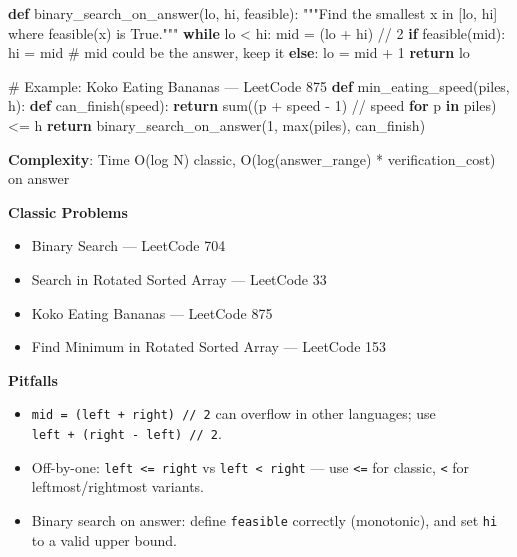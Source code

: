 \documentclass[11pt]{article}
\providecommand{\tightlist}{\setlength{\itemsep}{1pt}\setlength{\parskip}{0pt}}
\newenvironment{Shaded}{\begin{snugshade}}{\end{snugshade}}
\newcommand{\BuiltInTok}[1]{\textcolor[rgb]{0.50,0.55,0.55}{#1}}
\newcommand{\CommentTok}[1]{\textcolor[rgb]{0.48,0.49,0.49}{#1}}
\newcommand{\ControlFlowTok}[1]{\textcolor[rgb]{0.99,0.74,0.29}{\textbf{#1}}}
\newcommand{\DecValTok}[1]{\textcolor[rgb]{0.96,0.45,0.00}{#1}}
\newcommand{\KeywordTok}[1]{\textcolor[rgb]{0.81,0.81,0.76}{\textbf{#1}}}
\newcommand{\NormalTok}[1]{\textcolor[rgb]{0.81,0.81,0.76}{#1}}
\newcommand{\OperatorTok}[1]{\textcolor[rgb]{0.81,0.81,0.76}{#1}}
\begin{document}
\begin{Shaded}
\begin{Highlighting}[]
\KeywordTok{def}\NormalTok{ binary\_search\_on\_answer(lo, hi, feasible):}
    \CommentTok{"""Find the smallest x in [lo, hi] where feasible(x) is True."""}
    \ControlFlowTok{while}\NormalTok{ lo }\OperatorTok{\textless{}}\NormalTok{ hi:}
\NormalTok{        mid }\OperatorTok{=}\NormalTok{ (lo }\OperatorTok{+}\NormalTok{ hi) }\OperatorTok{//} \DecValTok{2}
        \ControlFlowTok{if}\NormalTok{ feasible(mid):}
\NormalTok{            hi }\OperatorTok{=}\NormalTok{ mid          }\CommentTok{\# mid could be the answer, keep it}
        \ControlFlowTok{else}\NormalTok{:}
\NormalTok{            lo }\OperatorTok{=}\NormalTok{ mid }\OperatorTok{+} \DecValTok{1}
    \ControlFlowTok{return}\NormalTok{ lo}

\CommentTok{\# Example: Koko Eating Bananas — LeetCode 875}
\KeywordTok{def}\NormalTok{ min\_eating\_speed(piles, h):}
    \KeywordTok{def}\NormalTok{ can\_finish(speed):}
        \ControlFlowTok{return} \BuiltInTok{sum}\NormalTok{((p }\OperatorTok{+}\NormalTok{ speed }\OperatorTok{{-}} \DecValTok{1}\NormalTok{) }\OperatorTok{//}\NormalTok{ speed }\ControlFlowTok{for}\NormalTok{ p }\KeywordTok{in}\NormalTok{ piles) }\OperatorTok{\textless{}=}\NormalTok{ h}
    \ControlFlowTok{return}\NormalTok{ binary\_search\_on\_answer(}\DecValTok{1}\NormalTok{, }\BuiltInTok{max}\NormalTok{(piles), can\_finish)}
\end{Highlighting}
\end{Shaded}

\textbf{Complexity}: Time O(log N) classic, O(log(answer\_range) * verification\_cost) on answer

\textbf{Classic Problems}

\begin{itemize}
\tightlist
\item
  Binary Search --- LeetCode 704
\item
  Search in Rotated Sorted Array --- LeetCode 33
\item
  Koko Eating Bananas --- LeetCode 875
\item
  Find Minimum in Rotated Sorted Array --- LeetCode 153
\end{itemize}

\textbf{Pitfalls}

\begin{itemize}
\tightlist
\item
  \texttt{mid\ =\ (left\ +\ right)\ //\ 2} can overflow in other languages; use \texttt{left\ +\ (right\ -\ left)\ //\ 2}.
\item
  Off-by-one: \texttt{left\ \textless{}=\ right} vs \texttt{left\ \textless{}\ right} --- use \texttt{\textless{}=} for classic, \texttt{\textless{}} for leftmost/rightmost variants.
\item
  Binary search on answer: define \texttt{feasible} correctly (monotonic), and set \texttt{hi} to a valid upper bound.
\end{itemize}
\end{document}
